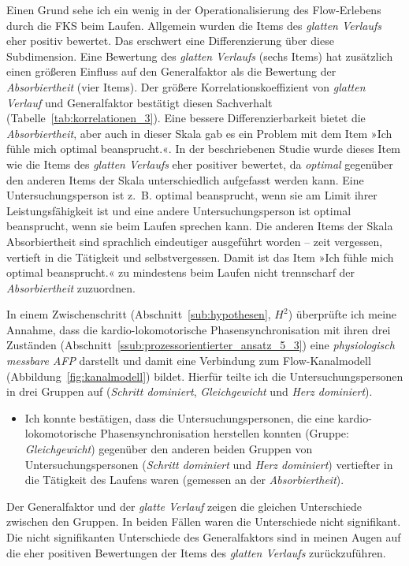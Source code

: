 Einen Grund sehe ich ein wenig in der Operationalisierung des Flow-Erlebens durch die \ac{FKS} beim Laufen. Allgemein wurden die Items des \emph{glatten Verlaufs} eher positiv bewertet. Das erschwert eine Differenzierung über diese Subdimension. Eine Bewertung des \emph{glatten Verlaufs} (sechs Items) hat zusätzlich einen größeren Einfluss auf den Generalfaktor als die Bewertung der \emph{Absorbiertheit} (vier Items). Der größere Korrelationskoeffizient von \emph{glatten Verlauf} und Generalfaktor bestätigt diesen Sachverhalt (Tabelle~\ref{tab:korrelationen_3}). Eine bessere Differenzierbarkeit bietet die \emph{Absorbiertheit}, aber auch in dieser Skala gab es ein Problem mit dem Item »Ich fühle mich optimal beansprucht.«. In der beschriebenen Studie wurde dieses Item wie die Items des \emph{glatten Verlaufs} eher positiver bewertet, da \emph{optimal} gegenüber den anderen Items der Skala unterschiedlich aufgefasst werden kann. Eine Untersuchungsperson ist z.~B. optimal beansprucht, wenn sie am Limit ihrer Leistungsfähigkeit ist und eine andere Untersuchungsperson ist optimal beansprucht, wenn sie beim Laufen sprechen kann. Die anderen Items der Skala Absorbiertheit sind sprachlich eindeutiger ausgeführt worden -- zeit vergessen, vertieft in die Tätigkeit und selbstvergessen. Damit ist das Item »Ich fühle mich optimal beansprucht.« zu mindestens beim Laufen nicht trennscharf der \emph{Absorbiertheit} zuzuordnen. 

In einem Zwischenschritt (Abschnitt~\ref{sub:hypothesen}, $H^2$) überprüfte ich meine Annahme, dass die kardio-lokomotorische Phasensynchronisation mit ihren drei Zuständen (Abschnitt~\ref{ssub:prozessorientierter_ansatz_5_3}) eine \emph{physiologisch messbare \ac{AFP}} darstellt und damit eine Verbindung zum Flow-Kanalmodell (Abbildung~\ref{fig:kanalmodell}) bildet. Hierfür teilte ich die Untersuchungspersonen in drei Gruppen auf (\emph{Schritt dominiert}, \emph{Gleichgewicht} und \emph{Herz dominiert}).
\begin{itemize}
	
	\item Ich konnte bestätigen, dass die Untersuchungspersonen, die eine kardio-lokomotorische Phasensynchronisation herstellen konnten (Gruppe: \emph{Gleichgewicht}) gegenüber den anderen beiden Gruppen von Untersuchungspersonen (\emph{Schritt dominiert} und \emph{Herz dominiert}) vertiefter in die Tätigkeit des Laufens waren (gemessen an der \emph{Absorbiertheit}).
\end{itemize}

Der Generalfaktor und der \emph{glatte Verlauf} zeigen die gleichen Unterschiede zwischen den Gruppen. In beiden Fällen waren die Unterschiede nicht signifikant. Die nicht signifikanten Unterschiede des Generalfaktors sind in meinen Augen auf die eher positiven Bewertungen der Items des \emph{glatten Verlaufs} zurückzuführen. 

